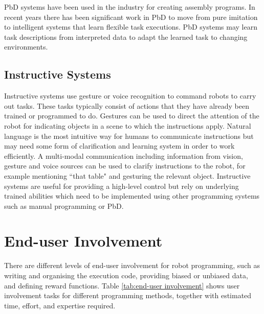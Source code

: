 PbD systems have been used in the industry for creating assembly programs. 
In recent years there has been significant work in PbD to move from pure imitation to intelligent systems that learn flexible task executions. 
PbD systems may learn task descriptions from interpreted data to adapt the learned task to changing environments.

\subsection{Instructive Systems}%
Instructive systems use gesture or voice recognition to command robots to carry out tasks.
These tasks typically consist of actions that they have already been trained or programmed to do. 
Gestures can be used to direct the attention of the robot for indicating objects in a scene to which the instructions apply. 
Natural language is the most intuitive way for humans to communicate instructions but may need some form of clarification and learning system in order to work efficiently. 
A multi-modal communication including information from vision, gesture and voice sources can be used to clarify instructions to the robot, for example mentioning ``that table" and gesturing the relevant object.
Instructive systems are useful for providing a high-level control but rely on underlying trained abilities which need to be implemented using other programming systems such as manual programming or PbD.

\section{End-user Involvement}
There are different levels of end-user involvement for robot programming, such as writing and organising the execution code, providing biased or unbiased data, and defining reward functions. Table \ref{tab:end-user involvement} shows user involvement tasks for different programming methods, together with estimated time, effort, and expertise required.

